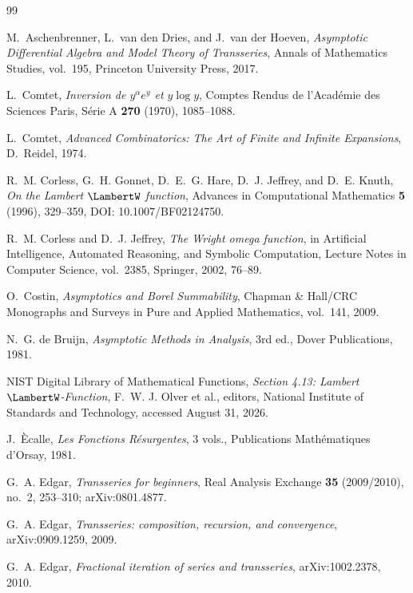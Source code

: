 \documentclass[11pt]{article}
\theoremstyle{pltheorem}
\begin{document}
\clearpage
\begin{thebibliography}{99}

M.~Aschenbrenner, L.~van den Dries, and J.~van der Hoeven,
\emph{Asymptotic Differential Algebra and Model Theory of Transseries},
Annals of Mathematics Studies, vol.~195, Princeton University Press, 2017.

L.~Comtet,
\emph{Inversion de \(y^\alpha e^y\) et \(y\log y\)},
Comptes Rendus de l'Acad\'emie des Sciences Paris, S\'erie A
\textbf{270} (1970), 1085--1088.

L.~Comtet,
\emph{Advanced Combinatorics: The Art of Finite and Infinite Expansions},
D.~Reidel, 1974.

R.~M. Corless, G.~H. Gonnet, D.~E.~G. Hare, D.~J. Jeffrey, and D.~E. Knuth,
\emph{On the Lambert \(\LambertW\) function},
Advances in Computational Mathematics \textbf{5} (1996), 329--359,
DOI: 10.1007/BF02124750.

R.~M. Corless and D.~J. Jeffrey,
\emph{The Wright omega function},
in Artificial Intelligence, Automated Reasoning, and Symbolic Computation,
Lecture Notes in Computer Science, vol.~2385, Springer, 2002, 76--89.

O.~Costin,
\emph{Asymptotics and Borel Summability},
Chapman \& Hall/CRC Monographs and Surveys in Pure and Applied Mathematics,
vol.~141, 2009.

N.~G. de Bruijn,
\emph{Asymptotic Methods in Analysis}, 3rd ed.,
Dover Publications, 1981.

NIST Digital Library of Mathematical Functions,
\emph{Section 4.13: Lambert \(\LambertW\)-Function},
F.~W. J. Olver et al., editors, National Institute of Standards and Technology,
accessed August 31, 2026.

J.~\`Ecalle,
\emph{Les Fonctions R\'esurgentes}, 3 vols.,
Publications Math\'ematiques d'Orsay, 1981.

G.~A. Edgar,
\emph{Transseries for beginners},
Real Analysis Exchange \textbf{35} (2009/2010), no.~2, 253--310;
arXiv:0801.4877.

G.~A. Edgar,
\emph{Transseries: composition, recursion, and convergence},
arXiv:0909.1259, 2009.

G.~A. Edgar,
\emph{Fractional iteration of series and transseries},
arXiv:1002.2378, 2010.


\end{thebibliography}
\end{document}
